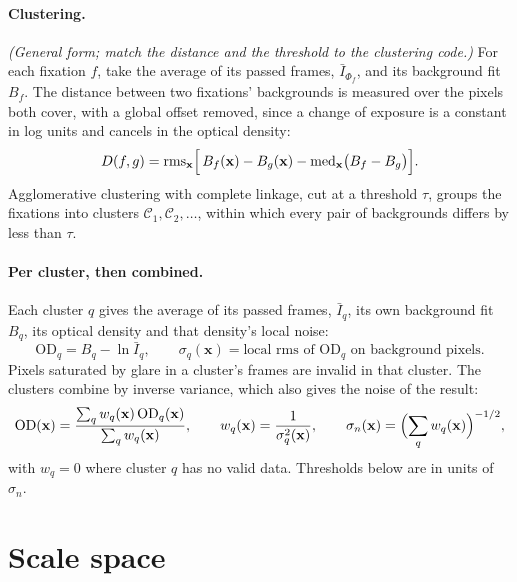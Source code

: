 \documentclass[11pt]{article}
\newcommand{\x}{\mathbf{x}}
\newcommand{\OD}{\mathrm{OD}}
\begin{document}
\paragraph{Clustering.} \emph{(General form; match the distance and the threshold to the clustering code.)} For each
fixation $f$, take the average of its passed frames, $\bar I_{\Phi_f}$, and its background fit $B_f$. The distance
between two fixations' backgrounds is measured over the pixels both cover, with a global offset removed, since a
change of exposure is a constant in log units and cancels in the optical density:
\begin{equation}
  D(f, g) = \operatorname{rms}_\x \Bigl[\, B_f(\x) - B_g(\x) - \operatorname{med}_\x \bigl(B_f - B_g\bigr) \Bigr].
\end{equation}
Agglomerative clustering with complete linkage, cut at a threshold $\tau$, groups the fixations into clusters
$\mathcal C_1, \mathcal C_2, \dots$, within which every pair of backgrounds differs by less than $\tau$.

\paragraph{Per cluster, then combined.} Each cluster $q$ gives the average of its passed frames, $\bar I_q$, its own
background fit $B_q$, its optical density and that density's local noise:
\begin{equation}
  \OD_q = B_q - \ln \bar I_q, \qquad \sigma_q(\x) = \text{local rms of } \OD_q \text{ on background pixels}.
\end{equation}
Pixels saturated by glare in a cluster's frames are invalid in that cluster. The clusters combine by inverse
variance, which also gives the noise of the result:
\begin{equation}
  \OD(\x) = \frac{\sum_q w_q(\x)\, \OD_q(\x)}{\sum_q w_q(\x)},
  \qquad
  w_q(\x) = \frac{1}{\sigma_q^2(\x)},
  \qquad
  \sigma_n(\x) = \Bigl(\sum_q w_q(\x)\Bigr)^{-1/2},
\end{equation}
with $w_q = 0$ where cluster $q$ has no valid data. Thresholds below are in units of $\sigma_n$.

\section{Scale space}\label{sec:scale}
\end{document}
